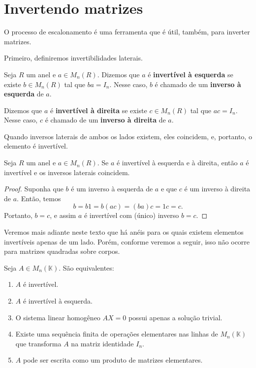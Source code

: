 \section{Invertendo matrizes}

O processo de escalonamento é uma ferramenta que é útil, também, para inverter matrizes.

Primeiro, definiremos invertibilidades laterais.

\begin{definition}
    Seja $R$ um anel e $a\in M_{n}(R)$.
    Dizemos que $a$ é \textbf{invertível à esquerda} se existe $b\in M_{n}(R)$ tal que $ba=I_n$.
    Nesse caso, $b$ é chamado de um \textbf{inverso à esquerda} de $a$.

    Dizemos que $a$ é \textbf{invertível à direita} se existe $c\in M_{n}(R)$ tal que $ac=I_n$.
    Nesse caso, $c$ é chamado de um \textbf{inverso à direita} de $a$.
\end{definition}

Quando inversos laterais de ambos os lados existem, eles coincidem, e, portanto, o elemento é invertível.

\begin{proposition}
    Seja $R$ um anel e $a\in M_{n}(R)$.
    Se $a$ é invertível à esquerda e à direita, então $a$ é invertível e os inversos laterais coincidem.
\end{proposition}
\begin{proof}
    Suponha que $b$ é um inverso à esquerda de $a$ e que $c$ é um inverso à direita de $a$.
    Então, temos
   \begin{equation*}
        b = b1 = b(ac) = (ba)c = 1c = c.
   \end{equation*}
    Portanto, $b=c$, e assim $a$ é invertível com (único) inverso $b=c$.
\end{proof}

Veremos mais adiante neste texto que há anéis para os quais existem elementos invertíveis apenas de um lado.
Porém, conforme veremos a seguir, isso não ocorre para matrizes quadradas sobre corpos.

\begin{lemma}
    Seja $A\in M_{n}(\mathbb K)$.
    São equivalentes:
    \begin{enumerate}[label=(\roman*)]
        \item $A$ é invertível.
        \item $A$ é invertível à esquerda.
        \item O sistema linear homogêneo $AX=0$ possui apenas a solução trivial.
        \item Existe uma sequência finita de operações elementares nas linhas de $M_{n}(\mathbb K)$ que transforma $A$ na matriz identidade $I_n$.
        \item $A$ pode ser escrita como um produto de matrizes elementares.
    \end{enumerate}
\end{lemma}

